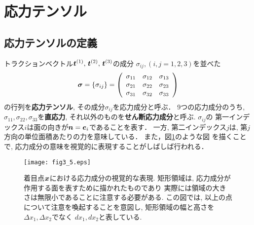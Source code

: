 \documentclass[10pt,a4j]{jbook}
\begin{document}
\section{応力テンソル}
\subsection{応力テンソルの定義}
トラクションベクトル$\mbox{\boldmath $t$}^{(1)},\, \mbox{\boldmath $t$}^{(2)},\,\mbox{\boldmath $t$}^{(3)}$の成分
$\sigma_{ij},(i,j=1,2,3)$を並べた
\begin{equation}
	\mbox{\boldmath $\sigma$}=\left\{ \sigma_{ij}\right\}
	=\left(
	\begin{array}{ccc}
		\sigma_{11} & \sigma_{12} & \sigma_{13} \\
		\sigma_{21} & \sigma_{22} & \sigma_{23} \\
		\sigma_{31} & \sigma_{32} & \sigma_{33} 
	\end{array}
	\right)
\end{equation}
の行列を{\rm \bf 応力テンソル}, その成分$\sigma_{ij}$を応力成分と呼ぶ．
9つの応力成分のうち, $\sigma_{11},\sigma_{22},\sigma_{33}$を{\rm\bf 直応力}, 
それ以外のものを{\bf \rm せん断応力成分}と呼ぶ. $\sigma_{ij}$の
第一インデックス$i$は面の向きが$\mbox{\boldmath $n$}=\mbox{\boldmath $e$}_i$であることを表す．
一方, 第二インデックス$j$は, 第$j$方向の単位面積あたりの力を意味している．
また，図\ref{fig:fig3_5}のような図
を描くことで, 応力成分の意味を視覚的に表現することがしばしば行われる．
\begin{figure}[h]
	\begin{center}
	\texttt{[image: fig3\_5.eps]} 
	\end{center}
	\caption{着目点$\mbox{\boldmath $x$}$における応力成分の視覚的な表現.
	矩形領域は, 応力成分が作用する面を表すために描かれたものであり
	実際には領域の大きさは無限小であることに注意する必要がある.
	この図では, 以上の点について注意を喚起することを意図し, 
	矩形領域の幅と高さを$\Delta x_1, \Delta x_2$でなく
	$dx_1, dx_2$と表している. }
	\label{fig:fig3_5}
\end{figure}
\end{document}
